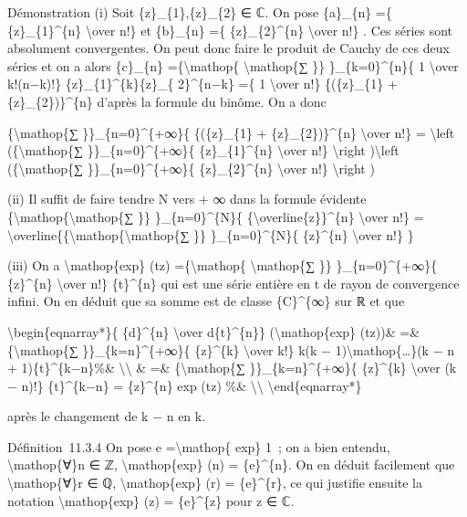 \documentclass[]{article}
\begin{document}
Démonstration (i) Soit \{z\}\_\{1\},\{z\}\_\{2\} ∈ ℂ. On pose
\{a\}\_\{n\} =\{ \{z\}\_\{1\}\^{}\{n\} \textbackslash{}over n!\} et
\{b\}\_\{n\} =\{ \{z\}\_\{2\}\^{}\{n\} \textbackslash{}over n!\} . Ces
séries sont absolument convergentes. On peut donc faire le produit de
Cauchy de ces deux séries et on a alors \{c\}\_\{n\}
=\{\textbackslash{}mathop\{ \textbackslash{}mathop\{∑ \}\}
\}\_\{k=0\}\^{}\{n\}\{ 1 \textbackslash{}over k!(n−k)!\}
\{z\}\_\{1\}\^{}\{k\}\{z\}\_\{ 2\}\^{}\{n−k\} =\{ 1 \textbackslash{}over
n!\} \{(\{z\}\_\{1\} + \{z\}\_\{2\})\}\^{}\{n\} d'après la formule du
binôme. On a donc

\{\textbackslash{}mathop\{∑ \}\}\_\{n=0\}\^{}\{+∞\}\{ \{(\{z\}\_\{1\} +
\{z\}\_\{2\})\}\^{}\{n\} \textbackslash{}over n!\} =
\textbackslash{}left (\{\textbackslash{}mathop\{∑
\}\}\_\{n=0\}\^{}\{+∞\}\{ \{z\}\_\{1\}\^{}\{n\} \textbackslash{}over
n!\} \textbackslash{}right )\textbackslash{}left
(\{\textbackslash{}mathop\{∑ \}\}\_\{n=0\}\^{}\{+∞\}\{
\{z\}\_\{2\}\^{}\{n\} \textbackslash{}over n!\} \textbackslash{}right )

(ii) Il suffit de faire tendre N vers + ∞ dans la formule évidente
\{\textbackslash{}mathop\{\textbackslash{}mathop\{∑ \}\}
\}\_\{n=0\}\^{}\{N\}\{ \{\textbackslash{}overline\{z\}\}\^{}\{n\}
\textbackslash{}over n!\} =
\textbackslash{}overline\{\{\textbackslash{}mathop\{\textbackslash{}mathop\{∑
\}\} \}\_\{n=0\}\^{}\{N\}\{ \{z\}\^{}\{n\} \textbackslash{}over n!\} \}

(iii) On a \textbackslash{}mathop\{exp\} (tz)
=\{\textbackslash{}mathop\{ \textbackslash{}mathop\{∑ \}\}
\}\_\{n=0\}\^{}\{+∞\}\{ \{z\}\^{}\{n\} \textbackslash{}over n!\}
\{t\}\^{}\{n\} qui est une série entière en t de rayon de convergence
infini. On en déduit que sa somme est de classe \{C\}\^{}\{∞\} sur ℝ et
que

\textbackslash{}begin\{eqnarray*\}\{ \{d\}\^{}\{n\} \textbackslash{}over
d\{t\}\^{}\{n\}\} (\textbackslash{}mathop\{exp\} (tz))\& =\&
\{\textbackslash{}mathop\{∑ \}\}\_\{k=n\}\^{}\{+∞\}\{ \{z\}\^{}\{k\}
\textbackslash{}over k!\} k(k − 1)\textbackslash{}mathop\{\ldots{}\}(k −
n + 1)\{t\}\^{}\{k−n\}\%\& \textbackslash{}\textbackslash{} \& =\&
\{\textbackslash{}mathop\{∑ \}\}\_\{k=n\}\^{}\{+∞\}\{ \{z\}\^{}\{k\}
\textbackslash{}over (k − n)!\} \{t\}\^{}\{k−n\} = \{z\}\^{}\{n\} exp
(tz) \%\& \textbackslash{}\textbackslash{}
\textbackslash{}end\{eqnarray*\}

après le changement de k − n en k.

Définition~11.3.4 On pose e =\textbackslash{}mathop\{ exp\} 1~; on a
bien entendu, \textbackslash{}mathop\{∀\}n ∈ ℤ,
\textbackslash{}mathop\{exp\} (n) = \{e\}\^{}\{n\}. On en déduit
facilement que \textbackslash{}mathop\{∀\}r ∈ ℚ,
\textbackslash{}mathop\{exp\} (r) = \{e\}\^{}\{r\}, ce qui justifie
ensuite la notation \textbackslash{}mathop\{exp\} (z) = \{e\}\^{}\{z\}
pour z ∈ ℂ.
\end{document}
